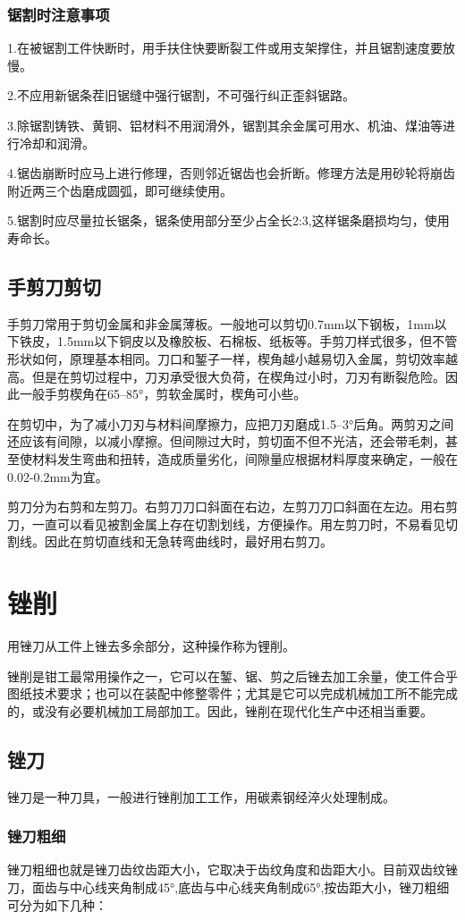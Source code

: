 \documentclass{ctexbook}
\begin{document}
\subsubsection{锯割时注意事项}
1.在被锯割工件快断时，用手扶住快要断裂工件或用支架撑住，并且锯割速度要放慢。

2.不应用新锯条茬旧锯缝中强行锯割，不可强行纠正歪斜锯路。

3.除锯割铸铁、黄铜、铝材料不用润滑外，锯割其余金属可用水、机油、煤油等进行冷却和润滑。

4.锯齿崩断时应马上进行修理，否则邻近锯齿也会折断。修理方法是用砂轮将崩齿附近两三个齿磨成圆弧，即可继续使用。

5.锯割时应尽量拉长锯条，锯条使用部分至少占全长2:3,这样锯条磨损均匀，使用寿命长。
\subsection{手剪刀剪切}
手剪刀常用于剪切金属和非金属薄板。一般地可以剪切0.7mm以下钢板，1mm以下铁皮，1.5mm以下铜皮以及橡胶板、石棉板、纸板等。手剪刀样式很多，但不管形状如何，原理基本相同。刀口和錾子一样，楔角越小越易切入金属，剪切效率越高。但是在剪切过程中，刀刃承受很大负荷，在楔角过小时，刀刃有断裂危险。因此一般手剪楔角在65--85°，剪软金属时，楔角可小些。

在剪切中，为了减小刀刃与材料间摩擦力，应把刀刃磨成1.5--3°后角。两剪刃之间还应该有间隙，以减小摩擦。但间隙过大时，剪切面不但不光洁，还会带毛刺，甚至使材料发生弯曲和扭转，造成质量劣化，间隙量应根据材料厚度来确定，一般在0.02-0.2mm为宜。

剪刀分为右剪和左剪刀。右剪刀刀口斜面在右边，左剪刀刀口斜面在左边。用右剪刀，一直可以看见被割金属上存在切割划线，方便操作。用左剪刀时，不易看见切割线。因此在剪切直线和无急转弯曲线时，最好用右剪刀。
\section{锉削}
用锉刀从工件上锉去多余部分，这种操作称为锂削。

锉削是钳工最常用操作之一，它可以在錾、锯、剪之后锉去加工余量，使工件合乎图纸技术要求；也可以在装配中修整零件；尤其是它可以完成机械加工所不能完成的，或没有必要机械加工局部加工。因此，锉削在现代化生产中还相当重要。
\subsection{锉刀}
锉刀是一种刀具，一般进行锉削加工工作，用碳素钢经淬火处理制成。
\subsubsection{锉刀粗细}
锉刀粗细也就是锉刀齿纹齿距大小，它取决于齿纹角度和齿距大小。目前双齿纹锉刀，面齿与中心线夹角制成45°,底齿与中心线夹角制成65°,按齿距大小，锉刀粗细可分为如下几种：
\end{document}
